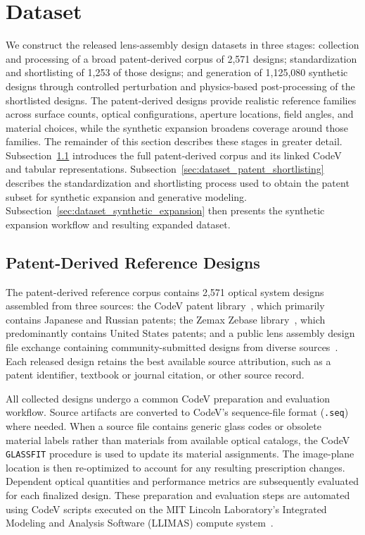 \section{Dataset}

We construct the released lens-assembly design datasets in three stages: collection and processing of a broad patent-derived corpus of 2,571 designs; standardization and shortlisting of 1,253 of those designs; and generation of 1,125,080 synthetic designs through controlled perturbation and physics-based post-processing of the shortlisted designs. The patent-derived designs provide realistic reference families across surface counts, optical configurations, aperture locations, field angles, and material choices, while the synthetic expansion broadens coverage around those families. The remainder of this section describes these stages in greater detail. Subsection~\ref{sec:dataset_patent_reference} introduces the full patent-derived corpus and its linked CodeV and tabular representations. Subsection~\ref{sec:dataset_patent_shortlisting} describes the standardization and shortlisting process used to obtain the patent subset for synthetic expansion and generative modeling. Subsection~\ref{sec:dataset_synthetic_expansion} then presents the synthetic expansion workflow and resulting expanded dataset.

\subsection{Patent-Derived Reference Designs}
\label{sec:dataset_patent_reference}

The patent-derived reference corpus contains 2,571 optical system designs assembled from three sources: the CodeV patent library~\cite{codev}, which primarily contains Japanese and Russian patents; the Zemax Zebase library~\cite{zemax_opticstudio}, which predominantly contains United States patents; and a public lens assembly design file exchange containing community-submitted designs from diverse sources~\cite{reiley_lens_design_exchange}. Each released design retains the best available source attribution, such as a patent identifier, textbook or journal citation, or other source record.

All collected designs undergo a common CodeV preparation and evaluation workflow. Source artifacts are converted to CodeV's sequence-file format (\texttt{.seq}) where needed. When a source file contains generic glass codes or obsolete material labels rather than materials from available optical catalogs, the CodeV \texttt{GLASSFIT} procedure is used to update its material assignments. The image-plane location is then re-optimized to account for any resulting prescription changes. Dependent optical quantities and performance metrics are subsequently evaluated for each finalized design. These preparation and evaluation steps are automated using CodeV scripts executed on the MIT Lincoln Laboratory's Integrated Modeling and Analysis Software (LLIMAS) compute system~\cite{Doyle2017LLIMAS}.

